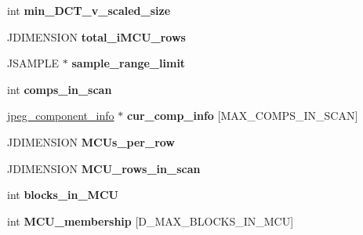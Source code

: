 \begin{DoxyCompactItemize}
\item 
\hypertarget{structjpeg__decompress__struct_a91ac3f0ca9c554b1690a0d18bc351762}{int {\bfseries min\+\_\+\+D\+C\+T\+\_\+v\+\_\+scaled\+\_\+size}}\label{structjpeg__decompress__struct_a91ac3f0ca9c554b1690a0d18bc351762}

\item 
\hypertarget{structjpeg__decompress__struct_ab210038772e2c74c35b6c0a36db9c6a9}{J\+D\+I\+M\+E\+N\+S\+I\+O\+N {\bfseries total\+\_\+i\+M\+C\+U\+\_\+rows}}\label{structjpeg__decompress__struct_ab210038772e2c74c35b6c0a36db9c6a9}

\item 
\hypertarget{structjpeg__decompress__struct_a7208357f11ec6db26e55d7b01d8c7a1b}{J\+S\+A\+M\+P\+L\+E $\ast$ {\bfseries sample\+\_\+range\+\_\+limit}}\label{structjpeg__decompress__struct_a7208357f11ec6db26e55d7b01d8c7a1b}

\item 
\hypertarget{structjpeg__decompress__struct_a2a28db865b9d49bfa9bc6335abf331c3}{int {\bfseries comps\+\_\+in\+\_\+scan}}\label{structjpeg__decompress__struct_a2a28db865b9d49bfa9bc6335abf331c3}

\item 
\hypertarget{structjpeg__decompress__struct_ab640afe8fb70108caed0c2520aab0c2a}{\hyperlink{structjpeg__component__info}{jpeg\+\_\+component\+\_\+info} $\ast$ {\bfseries cur\+\_\+comp\+\_\+info} \mbox{[}M\+A\+X\+\_\+\+C\+O\+M\+P\+S\+\_\+\+I\+N\+\_\+\+S\+C\+A\+N\mbox{]}}\label{structjpeg__decompress__struct_ab640afe8fb70108caed0c2520aab0c2a}

\item 
\hypertarget{structjpeg__decompress__struct_aafebfaa0046cc8b449ce2401c174697f}{J\+D\+I\+M\+E\+N\+S\+I\+O\+N {\bfseries M\+C\+Us\+\_\+per\+\_\+row}}\label{structjpeg__decompress__struct_aafebfaa0046cc8b449ce2401c174697f}

\item 
\hypertarget{structjpeg__decompress__struct_a6d1110064a4f2fbc46a8831fd148bca6}{J\+D\+I\+M\+E\+N\+S\+I\+O\+N {\bfseries M\+C\+U\+\_\+rows\+\_\+in\+\_\+scan}}\label{structjpeg__decompress__struct_a6d1110064a4f2fbc46a8831fd148bca6}

\item 
\hypertarget{structjpeg__decompress__struct_a76d2872b589796cb8d66428e660e37fb}{int {\bfseries blocks\+\_\+in\+\_\+\+M\+C\+U}}\label{structjpeg__decompress__struct_a76d2872b589796cb8d66428e660e37fb}

\item 
\hypertarget{structjpeg__decompress__struct_abcd46ef2fd7c068bdbdcde43efbd786e}{int {\bfseries M\+C\+U\+\_\+membership} \mbox{[}D\+\_\+\+M\+A\+X\+\_\+\+B\+L\+O\+C\+K\+S\+\_\+\+I\+N\+\_\+\+M\+C\+U\mbox{]}}\label{structjpeg__decompress__struct_abcd46ef2fd7c068bdbdcde43efbd786e}


\end{DoxyCompactItemize}
